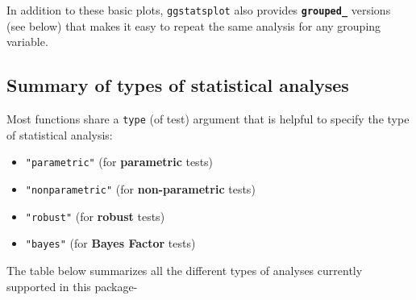\documentclass[]{article}
\providecommand{\tightlist}{%
  \setlength{\itemsep}{0pt}\setlength{\parskip}{0pt}}
\begin{document}
In addition to these basic plots, \texttt{ggstatsplot} also provides \textbf{\texttt{grouped\_}}
versions (see below) that makes it easy to repeat the same analysis for
any grouping variable.

\hypertarget{summary-of-types-of-statistical-analyses}{%
\subsection{Summary of types of statistical analyses}\label{summary-of-types-of-statistical-analyses}}

Most functions share a \texttt{type} (of test) argument that is helpful to specify the
type of statistical analysis:

\begin{itemize}
\tightlist
\item
  \texttt{"parametric"} (for \textbf{parametric} tests)
\item
  \texttt{"nonparametric"} (for \textbf{non-parametric} tests)
\item
  \texttt{"robust"} (for \textbf{robust} tests)
\item
  \texttt{"bayes"} (for \textbf{Bayes Factor} tests)
\end{itemize}

The table below summarizes all the different types of analyses
currently supported in this package-
\end{document}
